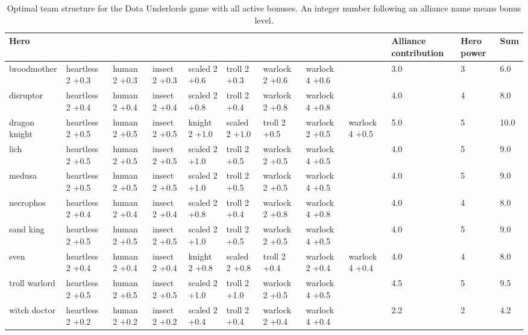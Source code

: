 \documentclass[smallextended]{svjour3}       %
\begin{document}
\begin{table}
\resizebox{16cm}{!} {
\begin{tabular}{l| *{8}{p{1.6cm}} | *{3}{ p{1cm}} }
{Hero} &                   &               &                &                &                &                  &                  &                  &  Alliance contribution &  Hero power &   Sum \\
\midrule
broodmother   &  heartless 2 +0.3  &  human 2 +0.3  &  insect 2 +0.3  &  scaled 2 +0.6  &   troll 2 +0.3  &  warlock  2 +0.6  &  warlock  4 +0.6  &                   &                  3.0 &           3 &   6.0 \\
disruptor     &  heartless 2 +0.4  &  human 2 +0.4  &  insect 2 +0.4  &  scaled 2 +0.8  &   troll 2 +0.4  &  warlock  2 +0.8  &  warlock  4 +0.8  &                   &                  4.0 &           4 &   8.0 \\
dragon knight &  heartless 2 +0.5  &  human 2 +0.5  &  insect 2 +0.5  &  knight 2 +1.0  &  scaled 2 +1.0  &     troll 2 +0.5  &  warlock  2 +0.5  &  warlock  4 +0.5  &                  5.0 &           5 &  10.0 \\
lich          &  heartless 2 +0.5  &  human 2 +0.5  &  insect 2 +0.5  &  scaled 2 +1.0  &   troll 2 +0.5  &  warlock  2 +0.5  &  warlock  4 +0.5  &                   &                  4.0 &           5 &   9.0 \\
medusa        &  heartless 2 +0.5  &  human 2 +0.5  &  insect 2 +0.5  &  scaled 2 +1.0  &   troll 2 +0.5  &  warlock  2 +0.5  &  warlock  4 +0.5  &                   &                  4.0 &           5 &   9.0 \\
necrophos     &  heartless 2 +0.4  &  human 2 +0.4  &  insect 2 +0.4  &  scaled 2 +0.8  &   troll 2 +0.4  &  warlock  2 +0.8  &  warlock  4 +0.8  &                   &                  4.0 &           4 &   8.0 \\
sand king     &  heartless 2 +0.5  &  human 2 +0.5  &  insect 2 +0.5  &  scaled 2 +1.0  &   troll 2 +0.5  &  warlock  2 +0.5  &  warlock  4 +0.5  &                   &                  4.0 &           5 &   9.0 \\
sven          &  heartless 2 +0.4  &  human 2 +0.4  &  insect 2 +0.4  &  knight 2 +0.8  &  scaled 2 +0.8  &     troll 2 +0.4  &  warlock  2 +0.4  &  warlock  4 +0.4  &                  4.0 &           4 &   8.0 \\
troll warlord &  heartless 2 +0.5  &  human 2 +0.5  &  insect 2 +0.5  &  scaled 2 +1.0  &   troll 2 +1.0  &  warlock  2 +0.5  &  warlock  4 +0.5  &                   &                  4.5 &           5 &   9.5 \\
witch doctor  &  heartless 2 +0.2  &  human 2 +0.2  &  insect 2 +0.2  &  scaled 2 +0.4  &   troll 2 +0.4  &  warlock  2 +0.4  &  warlock  4 +0.4  &                   &                  2.2 &           2 &   4.2 \\
\bottomrule
\end{tabular}
}
\caption{Optimal team structure for the Dota Underlords game with all active bonuses. An integer number following an alliance name means bonus level.}
\label{table:solution}
\end{table}
\end{document}
